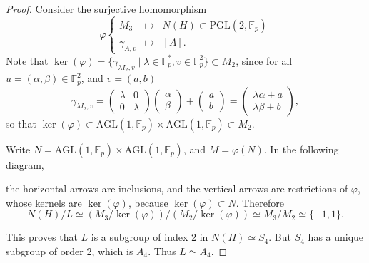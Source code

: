 \documentclass[11pt,a4paper]{article}
\newcommand{\F}{\mathbb{F}}
\begin{document}
{\begin{proof}
Consider the surjective homomorphism
$$\varphi
\left\{
\begin{array}{ccl}
M_3 & \mapsto & N(H) \subset \mathrm{PGL}(2,\F_p)\\
\gamma_{A,v} & \mapsto &[A].
\end{array}
\right.
$$
Note that $\ker(\varphi) = \{\gamma_{\lambda I_2, v} \mid \lambda \in \F_p^*, v \in \F_p^2\} \subset M_2$, since for all $u = (\alpha,\beta) \in \F_p^2$, and $v = (a,b)$
$$\gamma_{\lambda I_2,v} = \begin{pmatrix}\lambda & 0\\ 0 & \lambda \end{pmatrix} \begin{pmatrix} \alpha \\ \beta \end{pmatrix} + \begin{pmatrix} a \\ b \end{pmatrix} = \begin{pmatrix} \lambda \alpha + a \\ \lambda \beta + b \end{pmatrix},$$
so that $\ker(\varphi) \subset  \mathrm{AGL}(1,\F_p) \times \mathrm{AGL}(1,\F_p)  \subset M_2$.

Write $N = \mathrm{AGL}(1,\F_p) \times \mathrm{AGL}(1,\F_p)$, and $M = \varphi(N)$. In the following diagram, 
\begin{center}
\end{center}
the horizontal arrows are inclusions, and the vertical arrows are restrictions of $\varphi$, whose kernels are $\ker(\varphi)$, because $\ker(\varphi) \subset N$.  Therefore
$$N(H)/L \simeq (M_3/\ker(\varphi))/ (M_2/\ker(\varphi)) \simeq M_3/M_2 \simeq \{-1,1\}.$$

This proves that $L$ is a subgroup of index 2 in $N(H) \simeq S_4$. But $S_4$ has a unique subgroup of order 2, which is $A_4$. Thus $L \simeq A_4$.


\end{proof}}
\end{document}
